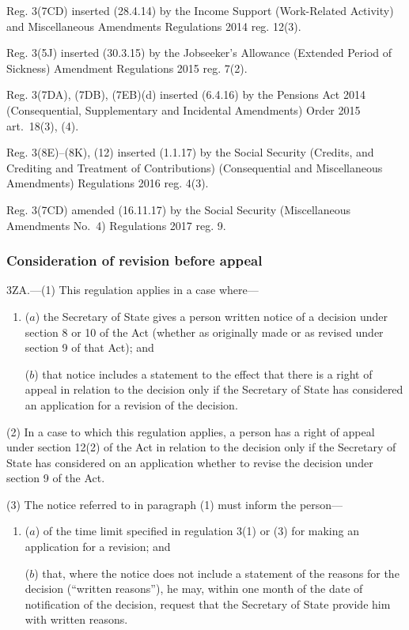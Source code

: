 \documentclass[12pt,a4paper]{article}
\begin{document}
{Reg. 3(7CD) inserted (28.4.14) by the Income Support (Work-Related Activity) and Miscellaneous Amendments Regulations 2014 reg. 12(3).

Reg. 3(5J) inserted (30.3.15) by the Jobseeker’s Allowance (Extended Period of Sickness) Amendment Regulations 2015 reg. 7(2).

Reg. 3(7DA), (7DB), (7EB)(d) inserted (6.4.16) by the Pensions Act 2014 (Consequential, Supplementary and Incidental Amendments) Order 2015 art.~18(3), (4).

Reg. 3(8E)--(8K), (12) inserted (1.1.17) by the Social Security (Credits, and Crediting and Treatment of Contributions) (Consequential and Miscellaneous Amendments) Regulations 2016 reg. 4(3).

Reg. 3(7CD) amended (16.11.17) by the Social Security (Miscellaneous Amendments No.~4) Regulations 2017 reg. 9.
}

\subsubsection[3ZA. Consideration of revision before appeal]{Consideration of revision before appeal}

3ZA.---(1)  This regulation applies in a case where—
\begin{enumerate}\item[]
($a$) the Secretary of State gives a person written notice of a decision under section 8 or 10 of the Act (whether as originally made or as revised under section 9 of that Act); and

($b$) that notice includes a statement to the effect that there is a right of appeal in relation to the decision only if the Secretary of State has considered an application for a revision of the decision.
\end{enumerate}

(2) In a case to which this regulation applies, a person has a right of appeal under section 12(2) of the Act in relation to the decision only if the Secretary of State has considered on an application whether to revise the decision under section 9 of the Act.

(3) The notice referred to in paragraph (1) must inform the person—
\begin{enumerate}\item[]
($a$) of the time limit specified in regulation 3(1) or (3) for making an application for a revision; and

($b$) that, where the notice does not include a statement of the reasons for the decision (“written reasons”), he may, within one month of the date of notification of the decision, request that the Secretary of State provide him with written reasons.
\end{enumerate}
\end{document}

